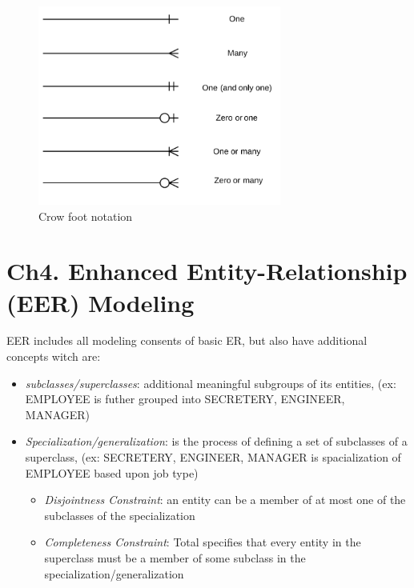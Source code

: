 \begin{figure}[!h]
    \centering
    \includegraphics[width=8cm]{image/crow_foot.png}
    \caption{Crow foot notation}
\end{figure}


\newpage
\section{Ch4. Enhanced Entity-Relationship (EER) Modeling}
EER includes all modeling consents of basic ER, but also have additional concepts witch are:
\begin{itemize}
    \item \textit{subclasses/superclasses}: additional meaningful subgroups of its entities, (ex: EMPLOYEE is futher grouped into SECRETERY, ENGINEER, MANAGER)
    \item \textit{Specialization/generalization}: is the process of defining a set of subclasses of a superclass, (ex: {SECRETERY, ENGINEER, MANAGER} is spacialization of EMPLOYEE based upon job type)
    \begin{itemize}
        \item \textit{Disjointness Constraint}: an entity can be a member of at most one of the subclasses of the specialization
        \item \textit{Completeness Constraint}: Total specifies that every entity in the superclass must be a member of some subclass in the specialization/generalization
    \end{itemize}
\end{itemize} 

